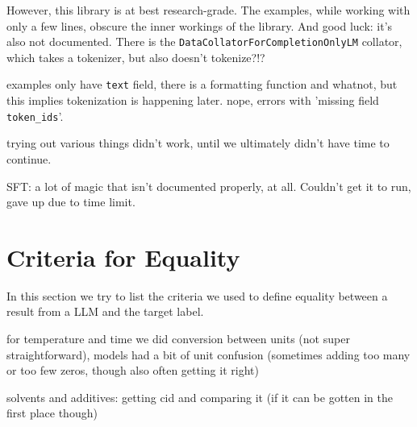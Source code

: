 {
\color{blue}
However, this library is at best research-grade. The examples, while working with only a few lines, obscure the inner workings of the library.
And good luck: it's also not documented. There is the \verb`DataCollatorForCompletionOnlyLM` collator, which takes a tokenizer, but also doesn't tokenize?!?

examples only have \verb`text` field, there is a formatting function and whatnot, but this implies tokenization is happening later. nope, errors with 'missing field \verb`token_ids`'.

trying out various things didn't work, until we ultimately didn't have time to continue.

SFT: a lot of magic that isn't documented properly, at all. Couldn't get it to run, gave up due to time limit.
}

\section{Criteria for Equality}\label{sec:equality}
In this section we try to list the criteria we used to define equality between a result from a \gls{LLM} and the target label.

{
\color{blue}
for temperature and time we did conversion between units (not super straightforward), models had a bit of unit confusion
(sometimes adding too many or too few zeros, though also often getting it right)

solvents and additives: getting cid and comparing it (if it can be gotten in the first place though)
}
